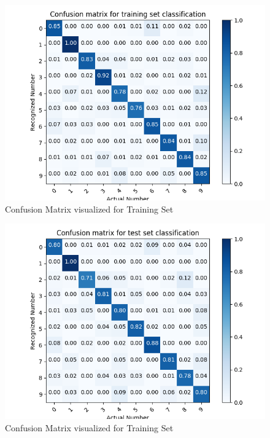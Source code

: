 \documentclass{article}
\begin{document}
\begin{figure}[H]
\centering
\includegraphics[width=0.9\linewidth]{img/cftrain.png}
\caption{Confusion Matrix visualized for Training Set}
\label{fig:cftrain}
\end{figure}
\begin{figure}[H]
\centering
\includegraphics[width=0.9\linewidth]{img/cftest.png}
\caption{Confusion Matrix visualized for Training Set}
\label{fig:cftest}
\end{figure}
\end{document}
